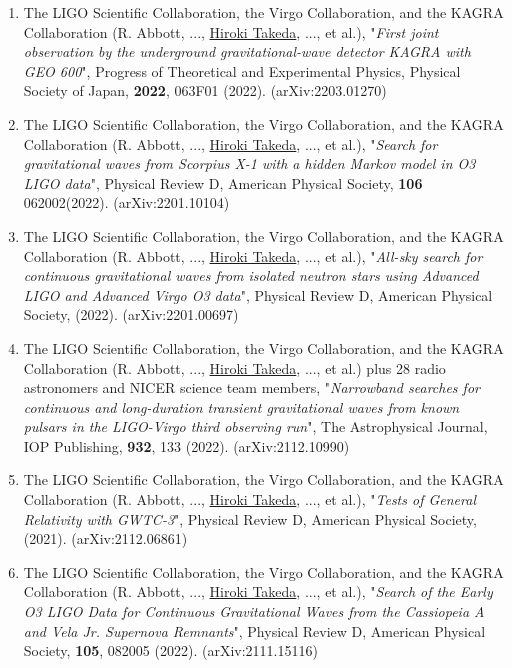 \documentclass[uplatex, 11pt]{jsarticle}
\begin{document}
\begin{enumerate}
\item The LIGO Scientific Collaboration, the Virgo Collaboration, and the KAGRA Collaboration (R. Abbott, ..., \uline{Hiroki Takeda}, ..., et al.), "\emph{First joint observation by the underground gravitational-wave detector KAGRA with GEO 600}", Progress of Theoretical and Experimental Physics, Physical Society of Japan, {\bf 2022}, 063F01 (2022). (arXiv:2203.01270)\\

\item The LIGO Scientific Collaboration, the Virgo Collaboration, and the KAGRA Collaboration (R. Abbott, ..., \uline{Hiroki Takeda}, ..., et al.), "\emph{Search for gravitational waves from Scorpius X-1 with a hidden Markov model in O3 LIGO data}", Physical Review D, American Physical Society, {\bf 106} 062002(2022). (arXiv:2201.10104)\\

\item The LIGO Scientific Collaboration, the Virgo Collaboration, and the KAGRA Collaboration (R. Abbott, ..., \uline{Hiroki Takeda}, ..., et al.),
"\emph{All-sky search for continuous gravitational waves from isolated neutron stars using Advanced LIGO and Advanced Virgo O3 data}", Physical Review D, American Physical Society, (2022). (arXiv:2201.00697)\\

\item The LIGO Scientific Collaboration, the Virgo Collaboration, and the KAGRA Collaboration (R. Abbott, ..., \uline{Hiroki Takeda}, ..., et al.) plus 28 radio astronomers and NICER science team members,
"\emph{Narrowband searches for continuous and long-duration transient gravitational waves from known pulsars in the LIGO-Virgo third observing run}", The Astrophysical Journal, IOP Publishing, {\bf 932}, 133 (2022). (arXiv:2112.10990)\\

\item The LIGO Scientific Collaboration, the Virgo Collaboration, and the KAGRA Collaboration (R. Abbott, ..., \uline{Hiroki Takeda}, ..., et al.), "\emph{Tests of General Relativity with GWTC-3}", Physical Review D, American Physical Society, (2021). (arXiv:2112.06861)\\

\item The LIGO Scientific Collaboration, the Virgo Collaboration, and the KAGRA Collaboration (R. Abbott, ..., \uline{Hiroki Takeda}, ..., et al.), "\emph{Search of the Early O3 LIGO Data for Continuous Gravitational Waves from the Cassiopeia A and Vela Jr. Supernova Remnants}", Physical Review D, American Physical Society, {\bf 105}, 082005 (2022). (arXiv:2111.15116)\\


\end{enumerate}
\end{document}
